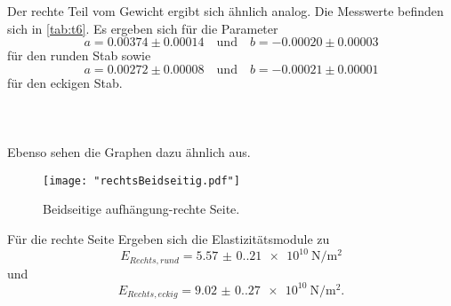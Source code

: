 \noindent Der rechte Teil vom Gewicht ergibt sich ähnlich analog. Die Messwerte
befinden sich in \autoref{tab:t6}. Es ergeben sich für die Parameter 
\begin{equation*}
  a = 0.00374 \pm 0.00014 \quad \text{und} \quad b = -0.00020 \pm 0.00003
\end{equation*}
für den runden Stab sowie
\begin{equation*}
  a = 0.00272 \pm 0.00008 \quad \text{und} \quad b = -0.00021 \pm 0.00001
\end{equation*}
für den eckigen Stab.
\\
\\
\\
\\
\noindent Ebenso sehen die Graphen dazu ähnlich aus.
\begin{figure}[H]
  \centering
  \texttt{[image: "rechtsBeidseitig.pdf"]}
  \caption{Beidseitige aufhängung-rechte Seite.}
  \label{fig:rechtsBeidseitig}
\end{figure}
\noindent Für die rechte Seite Ergeben sich die Elastizitätsmodule zu 
\begin{equation*}
  E_{Rechts,rund} = \qty{5.57(0.21)e10}{\newton\per\meter\squared}
\end{equation*}
und
\begin{equation*}
  E_{Rechts,eckig} = \qty{9.02(0.27)e10}{\newton\per\meter\squared}.
\end{equation*}






